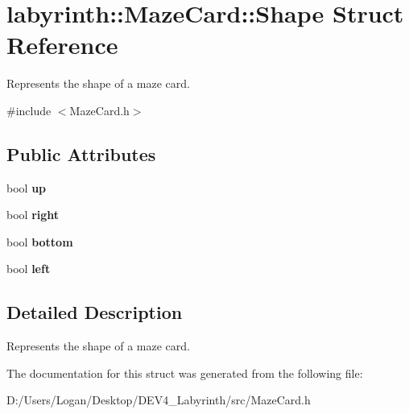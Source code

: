 \hypertarget{structlabyrinth_1_1_maze_card_1_1_shape}{}\section{labyrinth\+::Maze\+Card\+::Shape Struct Reference}
\label{structlabyrinth_1_1_maze_card_1_1_shape}


Represents the shape of a maze card.  




{\ttfamily \#include $<$Maze\+Card.\+h$>$}

\subsection*{Public Attributes}
\begin{DoxyCompactItemize}
\item 
\mbox{\label{structlabyrinth_1_1_maze_card_1_1_shape_adedf979b773a4286a7790517ca8286c4}} 
bool {\bfseries up}
\item 
\mbox{\label{structlabyrinth_1_1_maze_card_1_1_shape_a4b5e8c9b879391e7d01f919787327477}} 
bool {\bfseries right}
\item 
\mbox{\label{structlabyrinth_1_1_maze_card_1_1_shape_aff576c367eee62486481881da55d9c98}} 
bool {\bfseries bottom}
\item 
\mbox{\label{structlabyrinth_1_1_maze_card_1_1_shape_a19a699674fdbe566c0eb94f9acfd8461}} 
bool {\bfseries left}
\end{DoxyCompactItemize}


\subsection{Detailed Description}
Represents the shape of a maze card. 

The documentation for this struct was generated from the following file\+:\begin{DoxyCompactItemize}
\item 
D\+:/\+Users/\+Logan/\+Desktop/\+D\+E\+V4\+\_\+\+Labyrinth/src/Maze\+Card.\+h\end{DoxyCompactItemize}
